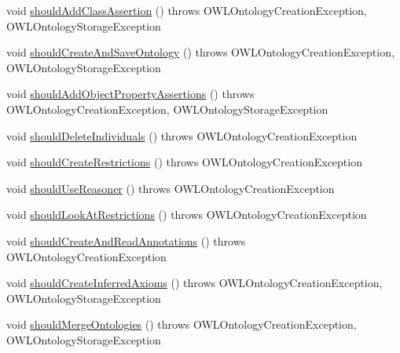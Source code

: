 \begin{DoxyCompactItemize}
void \hyperlink{classorg_1_1coode_1_1owlapi_1_1examples_1_1_examples_a56c669a13827080e56dd0796162ec9cc}{should\-Add\-Class\-Assertion} ()  throws O\-W\-L\-Ontology\-Creation\-Exception,             O\-W\-L\-Ontology\-Storage\-Exception 
\item 
void \hyperlink{classorg_1_1coode_1_1owlapi_1_1examples_1_1_examples_a9d750338fd6de1e4faf7d9a649243760}{should\-Create\-And\-Save\-Ontology} ()  throws O\-W\-L\-Ontology\-Creation\-Exception,             O\-W\-L\-Ontology\-Storage\-Exception 
\item 
void \hyperlink{classorg_1_1coode_1_1owlapi_1_1examples_1_1_examples_a3ded89026f644f95315c0e124f6fc574}{should\-Add\-Object\-Property\-Assertions} ()  throws O\-W\-L\-Ontology\-Creation\-Exception,             O\-W\-L\-Ontology\-Storage\-Exception 
\item 
void \hyperlink{classorg_1_1coode_1_1owlapi_1_1examples_1_1_examples_a77b34d5b6467abf11bf301a128b2fad6}{should\-Delete\-Individuals} ()  throws O\-W\-L\-Ontology\-Creation\-Exception 
\item 
void \hyperlink{classorg_1_1coode_1_1owlapi_1_1examples_1_1_examples_abd298a6c02a77cbc7ca0acaba624322a}{should\-Create\-Restrictions} ()  throws O\-W\-L\-Ontology\-Creation\-Exception 
\item 
void \hyperlink{classorg_1_1coode_1_1owlapi_1_1examples_1_1_examples_a7c277a90f0c1779a4d20cd064205b3ed}{should\-Use\-Reasoner} ()  throws O\-W\-L\-Ontology\-Creation\-Exception 
\item 
void \hyperlink{classorg_1_1coode_1_1owlapi_1_1examples_1_1_examples_ad57538176523ec9f389a26555e21cc21}{should\-Look\-At\-Restrictions} ()  throws O\-W\-L\-Ontology\-Creation\-Exception 
\item 
void \hyperlink{classorg_1_1coode_1_1owlapi_1_1examples_1_1_examples_a7ebd773a0def5cd0438a024695ea60de}{should\-Create\-And\-Read\-Annotations} ()  throws O\-W\-L\-Ontology\-Creation\-Exception 
\item 
void \hyperlink{classorg_1_1coode_1_1owlapi_1_1examples_1_1_examples_ac759eb9761d14fd168877465df992f2e}{should\-Create\-Inferred\-Axioms} ()  throws O\-W\-L\-Ontology\-Creation\-Exception,             O\-W\-L\-Ontology\-Storage\-Exception 
\item 
void \hyperlink{classorg_1_1coode_1_1owlapi_1_1examples_1_1_examples_ad410359291e920220362bc78f8e6cf20}{should\-Merge\-Ontologies} ()  throws O\-W\-L\-Ontology\-Creation\-Exception,             O\-W\-L\-Ontology\-Storage\-Exception 
\item 

\end{DoxyCompactItemize}
